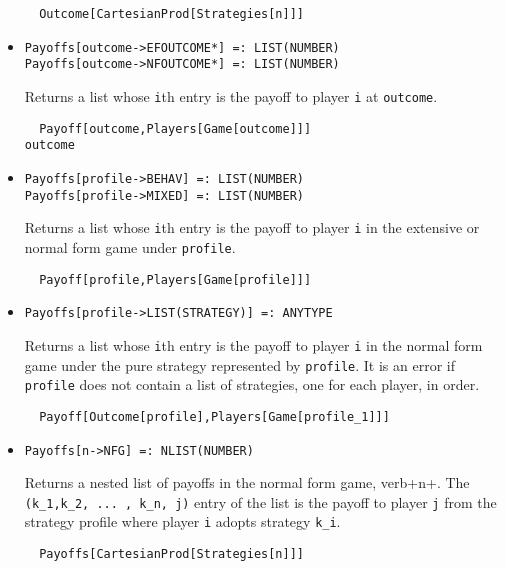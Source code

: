 \begin{itemize}
\begin{verbatim}
  Outcome[CartesianProd[Strategies[n]]]
\end{verbatim} 
\ed


\item{}
\protect \large \begin{verbatim}
Payoffs[outcome->EFOUTCOME*] =: LIST(NUMBER) 
Payoffs[outcome->NFOUTCOME*] =: LIST(NUMBER) 
\end{verbatim}\normalsize

\bd 
Returns a list whose \verb+i+th entry is the payoff to player \verb+i+
at \verb+outcome+.
\begin{verbatim}
  Payoff[outcome,Players[Game[outcome]]]
outcome
\end{verbatim} 
\ed

\item{}
\protect \large \begin{verbatim}
Payoffs[profile->BEHAV] =: LIST(NUMBER) 
Payoffs[profile->MIXED] =: LIST(NUMBER) 
\end{verbatim}\normalsize

\bd 
Returns a list whose \verb+i+th entry is the payoff to player \verb+i+
in the extensive or normal form game under \verb+profile+.
\begin{verbatim}
  Payoff[profile,Players[Game[profile]]]
\end{verbatim} 
\ed

\item{}
\protect \large \begin{verbatim}
Payoffs[profile->LIST(STRATEGY)] =: ANYTYPE 
\end{verbatim}\normalsize

\bd 
Returns a list whose \verb+i+th entry is the payoff to player \verb+i+
in the normal form game under the pure strategy represented by \verb+profile+.
It is an error if \verb+profile+ does not contain a list of
strategies, one for each player, in order.  
\begin{verbatim}
  Payoff[Outcome[profile],Players[Game[profile_1]]]
\end{verbatim} 
\ed


\item{}
\protect \large \begin{verbatim}
Payoffs[n->NFG] =: NLIST(NUMBER) 
\end{verbatim}\normalsize

\bd 
Returns a nested list of payoffs in the normal form game, verb+n+.
The \verb+(k_1,k_2, ... , k_n, j)+ entry of the list is the payoff to
player \verb+j+ from the strategy profile where player \verb+i+ adopts
strategy \verb+k_i+.
\begin{verbatim}
  Payoffs[CartesianProd[Strategies[n]]]
\end{verbatim} 
\ed
  


\end{itemize}
